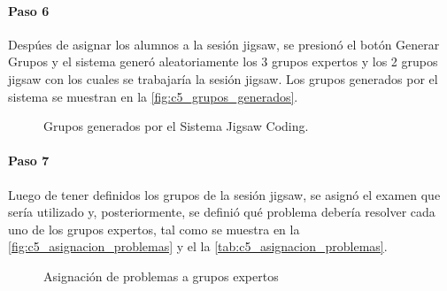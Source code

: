 \paragraph{Paso 6}
Despúes de asignar los alumnos a la sesión jigsaw, se presionó el botón Generar Grupos y el sistema generó aleatoriamente los 3 grupos expertos y los 2 grupos jigsaw con los cuales se trabajaría la sesión jigsaw. Los grupos generados por el sistema se muestran en la \autoref{fig:c5_grupos_generados}.

\begin{figure}
	\centering
	\caption{Grupos generados por el Sistema Jigsaw Coding.}
	\label{fig:c5_grupos_generados}
\end{figure}

\paragraph{Paso 7}
Luego de tener definidos los grupos de la sesión jigsaw, se asignó el examen que sería utilizado y, posteriormente, se definió qué problema debería resolver cada uno de los grupos expertos, tal como se muestra en la \autoref{fig:c5_asignacion_problemas} y el la \autoref{tab:c5_asignacion_problemas}.

\begin{figure}[h!]
	\centering
	\caption{Asignación de problemas a grupos expertos}
	\label{fig:c5_asignacion_problemas}
\end{figure}

